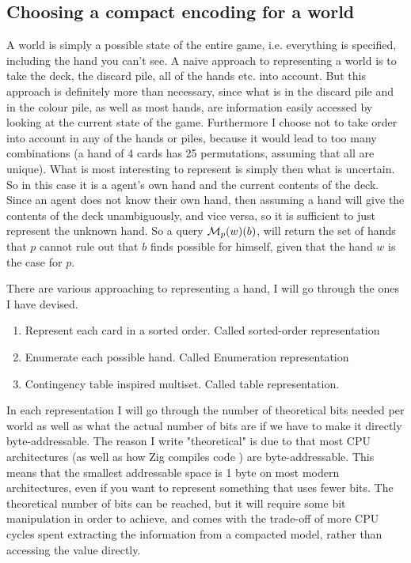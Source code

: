 \subsection{Choosing a compact encoding for a world} \label{sec:representing-a-world}
A world is simply a possible state of the entire game, i.e. everything is specified, including the hand you can't see.
A naive approach to representing a world is to take the deck, the discard pile, all of the hands etc. into account.
But this approach is definitely more than necessary, since what is in the discard pile and in the colour pile, as well as most hands, are information easily accessed by looking at the current state of the game.
Furthermore I choose not to take order into account in any of the hands or piles, because it would lead to too many combinations (a hand of 4 cards has 25 permutations, assuming that all are unique).
What is most interesting to represent is simply then what is uncertain.
So in this case it is a agent's own hand and the current contents of the deck.
Since an agent does not know their own hand, then assuming a hand will give the contents of the deck unambiguously, and vice versa, so it is sufficient to just represent the unknown hand.
So a query $\mathcal{M}_p(w)(b)$, will return the set of hands that $p$ cannot rule out that $b$ finds possible for himself, given that the hand $w$ is the case for $p$.

There are various approaching to representing a hand, I will go through the ones I have devised. 

\begin{enumerate}
\item Represent each card in a sorted order. Called sorted-order representation
\item Enumerate each possible hand. Called Enumeration representation
\item Contingency table inspired multiset. Called table representation.
\end{enumerate}

In each representation I will go through the number of theoretical bits needed per world as well as what the actual number of bits are if we have to make it directly byte-addressable.
The reason I write "theoretical" is due to that most CPU architectures (as well as how Zig compiles code \cite{zigdocspackedstruct}) are byte-addressable.
This means that the smallest addressable space is 1 byte on most modern architectures, even if you want to represent something that uses fewer bits.
The theoretical number of bits can be reached, but it will require some bit manipulation in order to achieve, and comes with the trade-off of more CPU cycles spent extracting the information from a compacted model, rather than accessing the value directly. 


